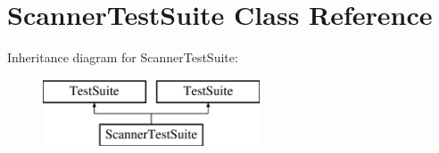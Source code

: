 \hypertarget{classScannerTestSuite}{\section{Scanner\-Test\-Suite Class Reference}
\label{classScannerTestSuite}
}
Inheritance diagram for Scanner\-Test\-Suite\-:\begin{figure}[H]
\begin{center}
\leavevmode
\includegraphics[height=2.000000cm]{classScannerTestSuite}
\end{center}
\end{figure}
